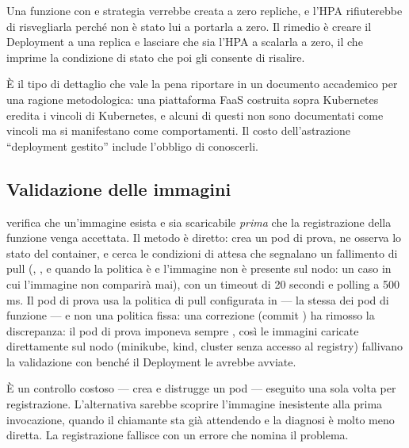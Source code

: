 Una funzione con  e strategia  verrebbe creata a
zero repliche, e l'HPA rifiuterebbe di risvegliarla perch\'e non \`e stato lui a
portarla a zero. Il rimedio \`e creare il Deployment a una replica e lasciare che
sia l'HPA a scalarla a zero, il che imprime la condizione di stato che poi gli
consente di risalire.

\`E il tipo di dettaglio che vale la pena riportare in un documento accademico
per una ragione metodologica: una piattaforma FaaS costruita sopra Kubernetes
eredita i vincoli di Kubernetes, e alcuni di questi non sono documentati come
vincoli ma si manifestano come comportamenti. Il costo dell'astrazione
``deployment gestito'' include l'obbligo di conoscerli.

\subsection{Validazione delle immagini}

 verifica che un'immagine esista e sia scaricabile
\emph{prima} che la registrazione della funzione venga accettata. Il metodo \`e
diretto: crea un pod di prova, ne osserva lo stato del container, e cerca le
condizioni di attesa che segnalano un fallimento di pull
(, , e 
quando la politica \`e  e l'immagine non \`e presente sul nodo:
un caso in cui l'immagine non comparir\`a mai), con un timeout di 20 secondi e
polling a 500\,ms. Il pod di prova usa la politica di pull configurata in
 --- la stessa dei pod di funzione --- e non
una politica fissa: una correzione (commit ) ha rimosso la
discrepanza: il pod di prova imponeva sempre , cos\`i le immagini
caricate direttamente sul nodo (minikube, kind, cluster senza accesso al registry)
fallivano la validazione con  bench\'e il
Deployment le avrebbe avviate.

\`E un controllo costoso --- crea e distrugge un pod --- eseguito una sola volta
per registrazione. L'alternativa sarebbe scoprire l'immagine inesistente alla
prima invocazione, quando il chiamante sta gi\`a attendendo e la diagnosi \`e
molto meno diretta. La registrazione fallisce con un errore che nomina il
problema.

\section{}

